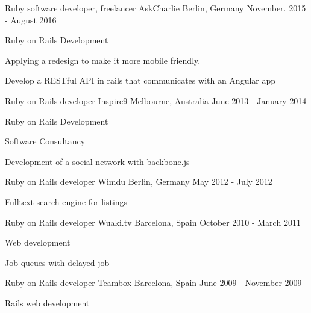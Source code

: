 \begin{cventries}
  \cventry
    {Ruby software developer, freelancer} %
    {AskCharlie} %
    {Berlin, Germany} %
    {November. 2015 - August 2016} %
    {
      \begin{cvitems} %
        \item {Ruby on Rails Development}
        \item {Applying a redesign to make it more mobile friendly.}
        \item {Develop a RESTful API in rails that communicates with an Angular app}
      \end{cvitems}
    }

  \cventry
    {Ruby on Rails developer} %
    {Inspire9} %
    {Melbourne, Australia} %
    {June 2013 - January 2014} %
    {
      \begin{cvitems} %
        \item {Ruby on Rails Development}
        \item {Software Consultancy}
        \item {Development of a social network with backbone.js}
      \end{cvitems}
    }

  \cventry
    {Ruby on Rails developer} %
    {Wimdu} %
    {Berlin, Germany} %
    {May 2012 - July 2012} %
    {
      \begin{cvitems} %
        \item {Fulltext search engine for listings}
      \end{cvitems}
    }

  \cventry
    {Ruby on Rails developer} %
    {Wuaki.tv} %
    {Barcelona, Spain} %
    {October 2010 - March 2011} %
    {
      \begin{cvitems} %
        \item {Web development}
        \item {Job queues with delayed job}
      \end{cvitems}
    }

  \cventry
    {Ruby on Rails developer} %
    {Teambox} %
    {Barcelona, Spain} %
    {June 2009 - November 2009} %
    {
      \begin{cvitems} %
        \item {Rails web development}
      \end{cvitems}
    }

\end{cventries}
